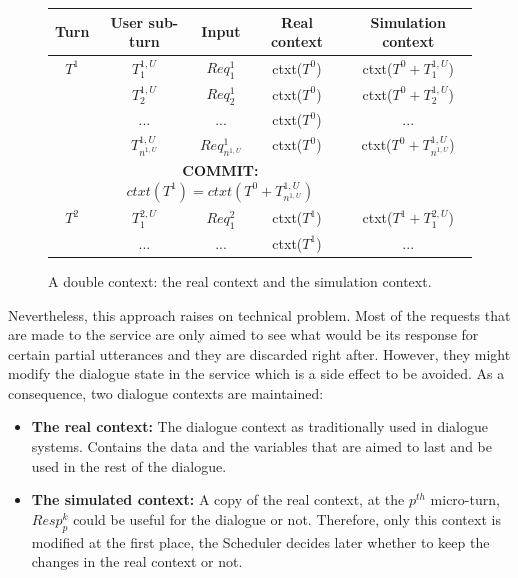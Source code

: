 	\begin{figure}[htp]
		\begin{center}
		\begin{tabular}{|c|c|c|c|c|}
			 \hline
			 \textbf{Turn} & \textbf{User sub-turn} & \textbf{Input} & \textbf{Real context} & \textbf{Simulation context} \\
			 \hline
			 $T^1$ & $T^{1,U}_1$ & $Req^1_1$ & ctxt($T^0$) & ctxt($T^0 + T^{1,U}_1$) \\
						 & $T^{1,U}_2$ & $Req^1_2$ & ctxt($T^0$) & ctxt($T^0 + T^{1,U}_2$) \\
						 &    ...     &     ...     & ctxt($T^0$) & ... \\
						 & $T^{1,U}_{n^{1,U}}$ & $Req^1_{n^{1,U}}$ & ctxt($T^0$) & ctxt($T^0 + T^{1,U}_{n^{1,U}}$) \\
			 \hline
						 & \multicolumn{3}{c}{\multirow{2}{*}{\textbf{COMMIT:} $ ctxt(T^1) = ctxt(T^0 + T^{1,U}_{n^{1,U}}) $}} & \\
						 & \multicolumn{3}{c}{} & \\
			 \hline
			 $T^2$ & $T^{2,U}_1$ & $Req^2_1$ & ctxt($T^1$) & ctxt($T^1 + T^{2,U}_1$) \\
						 &    ...     &     ...     & ctxt($T^1$) & ... \\
			 \hline
		\end{tabular}
	\end{center}
	\caption{A double context: the real context and the simulation context.}
	\label{ContextChrono}
\end{figure}
        
        Nevertheless, this approach raises on technical problem. Most of the requests that are made to the service are only aimed to see what would be its response for certain partial utterances and they are discarded right after. However, they might modify the dialogue state in the service which is a side effect to be avoided. As a consequence, two dialogue contexts are maintained:
        
        \begin{itemize}
           	\item \textbf{The real context:} The dialogue context as traditionally used in dialogue systems. Contains the data and the variables that are aimed to last and be used in the rest of the dialogue.
        	\item \textbf{The simulated context:} A copy of the real context, at the $p^{th}$ micro-turn, $Resp^k_p$ could be useful for the dialogue or not. Therefore, only this context is modified at the first place, the Scheduler decides later whether to keep the changes in the real context or not.
        \end{itemize}
        
